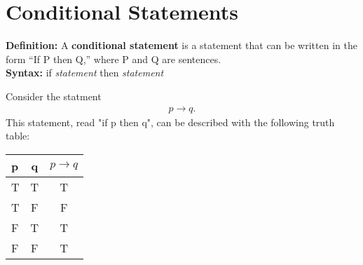 \documentclass{report}
\begin{document}
    \bigbreak \noindent \bigbreak \noindent 
    \section{Conditional Statements}
    \bigbreak \noindent 
    \begin{mdframed}
        \textbf{Definition:}
        A \textbf{conditional statement} is a statement that can be written in the form “If P then Q,” where P and Q are sentences. \\
        \textbf{Syntax:} if \textit{statement} then \textit{statement}
    \end{mdframed}
    \bigbreak \noindent 
    Consider the statment
    \begin{align*}
        p \rightarrow q
    .\end{align*}
    This statement, read "if p then q", can be described with the following truth table:
    \begin{center}
        \begin{tabular}{|l|c|c|}
        \hline
        p & q & $p \rightarrow q $\\
        	\hline
        T &T  & T  \\
        	\hline
        T&F & F\\
        \hline
        F&T & T\\
        \hline
        F&F & T\\
        \hline
        \end{tabular}
    \end{center}
    \bigbreak \noindent 

    \pagebreak \bigbreak \noindent 
\end{document}
